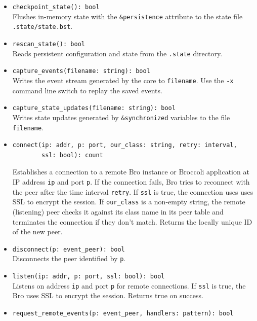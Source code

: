 \documentclass[10pt,landscape]{article}
\newcommand{\ReturnsTrueOnSuccess}{Returns true on success.\xspace}
\begin{document}
\begin{multicols*}{2}
{\begin{itemize}
  \item \verb|checkpoint_state(): bool|\\
    Flushes in-memory state with the \verb|&persistence| attribute to the state
    file \texttt{.state/state.bst}.
  \item \verb|rescan_state(): bool|\\
    Reads persistent configuration and state from the \texttt{.state}
    directory.
  \item \verb|capture_events(filename: string): bool|\\
    Writes the event stream generated by the core to \verb|filename|. Use the
    \texttt{-x} command line switch to replay the saved events.
  \item \verb|capture_state_updates(filename: string): bool|\\
    Writes state updates generated by \verb|&synchronized| variables to the
    file \verb|filename|.
  \item \begin{verbatim}
connect(ip: addr, p: port, our_class: string, retry: interval,
        ssl: bool): count
\end{verbatim}
    Establishes a connection to a remote Bro instance or Broccoli application
    at IP address \verb|ip| and port \verb|p|. If the connection fails, Bro
    tries to reconnect with the peer after the time interval \verb|retry|. If
    \verb|ssl| is true, the connection uses uses SSL to encrypt the session.
    If \verb|our_class| is a non-empty string, the remote (listening) peer
    checks it against its class name in its peer table and terminates the
    connection if they don't match.
    Returns the locally unique ID of the new peer.
  \item \verb|disconnect(p: event_peer): bool|\\
    Disconnects the peer identified by \verb|p|.
  \item \verb|listen(ip: addr, p: port, ssl: bool): bool|\\
    Listens on address \verb|ip| and port \verb|p| for remote connections. If
    \verb|ssl| is true, the Bro uses SSL to encrypt the session.
    \ReturnsTrueOnSuccess
  \item \verb|request_remote_events(p: event_peer, handlers: pattern): bool|\\

\end{itemize}}
\end{multicols*}
\end{document}
